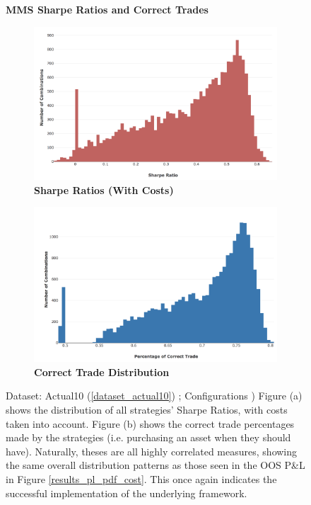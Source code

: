 \documentclass[a4paper,11pt,oneside]{article}
\theoremstyle{plain}
\theoremstyle{definition}
\begin{document}
	
	\begin{figure}[H]
		\centering
		\textbf{MMS Sharpe Ratios and Correct Trades}
		\begin{subfigure}{.44\textwidth}
			\centering 
			\includegraphics[scale=0.23]{images/results/mms/sharpe_ratios.png} 
			\caption{\textbf{Sharpe Ratios (With Costs)}}
			\label{figure-sharpe_ratios}
		\end{subfigure}%
		\begin{subfigure}{.5\textwidth}
			\includegraphics[scale=0.22]{images/results/mms/confusion_dist.png} 
			\caption{\textbf{Correct Trade Distribution}}
			\label{figure-confusion_dist}
		\end{subfigure}
		\caption[MMS Sharpe Ratios and Correct Trades]{Dataset: Actual10 (\ref{dataset_actual10}) ; Configurations )
			\newline Figure (a) shows the distribution of all strategies' Sharpe Ratios, with costs taken into account. Figure (b) shows the correct trade percentages made by the strategies (i.e. purchasing an asset when they should have). Naturally, theses are all highly correlated measures, showing the same overall distribution patterns as those seen in the OOS P\&L in Figure \ref{results_pl_pdf_cost}. This once again indicates the successful implementation of the underlying framework.
		}
		\label{results_mms_sr_conf}
	\end{figure}
\end{document}
